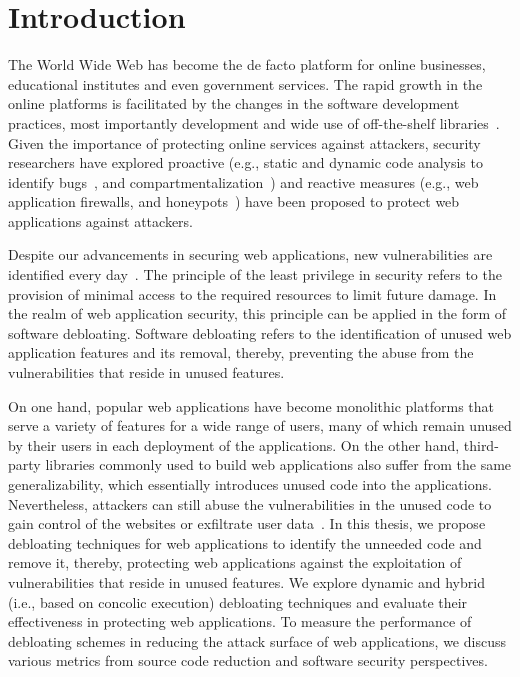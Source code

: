 \chapter{Introduction}

The World Wide Web has become the de facto platform for online businesses, educational institutes and even government services. 
The rapid growth in the online platforms is facilitated by the changes in the software development practices, most importantly development and wide use of off-the-shelf libraries~\cite{packagiststats, npmstatistics, pypi}. 
Given the importance of protecting online services against attackers, security researchers have explored proactive (e.g., static and dynamic code analysis to identify bugs~\cite{jovanovic2006pixy, dahse2010rips, alhuzali2018navex}, and 
compartmentalization~\cite{vasilakis2018breakapp}) and reactive measures (e.g., web application firewalls, and honeypots~\cite{makiou2014improving, barron2021click}) have been proposed to protect web applications against attackers. 

Despite our advancements in securing web applications, new vulnerabilities are identified every day~\cite{cvedetails}. 
The principle of the least privilege in security refers to the provision of minimal access to the required resources to limit future damage. 
In the realm of web application security, this principle can be applied in the form of software debloating. 
Software debloating refers to the identification of unused web application features and its removal, thereby, preventing the abuse from the vulnerabilities that reside in unused features. 

On one hand, popular web applications have become monolithic platforms that serve a variety of features for a wide range of users, many of which remain unused by their users in each deployment of the applications. 
On the other hand, third-party libraries commonly used to build web applications also suffer from the same generalizability, which essentially introduces unused code into the applications. 
Nevertheless, attackers can still abuse the vulnerabilities in the unused code to gain control of the websites or exfiltrate user data~\cite{drupalVulenrability, zendVulnerability, phpunitVulnerability, PHPGGC}. 
In this thesis, we propose debloating techniques for web applications to identify the unneeded code and remove it, thereby, protecting web applications against the exploitation of vulnerabilities that reside in unused features. 
We explore dynamic and hybrid (i.e., based on concolic execution) debloating techniques and evaluate their effectiveness in protecting web applications. 
To measure the performance of debloating schemes in reducing the attack surface of web applications, we discuss various metrics from source code reduction and software security perspectives. 



